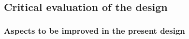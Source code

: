 




\subsection{Critical evaluation of the design}


\subsubsection{Aspects to be improved in the present design}


